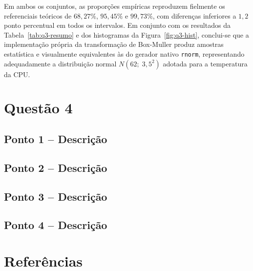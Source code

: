 \documentclass[10pt,a4paper]{article}
\begin{document}
Em ambos os conjuntos, as proporções empíricas reproduzem fielmente os referenciais teóricos de $68{,}27\%$, $95{,}45\%$ e $99{,}73\%$, com diferenças inferiores a $1{,}2$ ponto percentual em todos os intervalos. Em conjunto com os resultados da Tabela~\ref{tab:q3-resumo} e dos histogramas da Figura~\ref{fig:q3-hist}, conclui-se que a implementação própria da transformação de Box-Muller produz amostras estatística e visualmente equivalentes às do gerador nativo \texttt{rnorm}, representando adequadamente a distribuição normal $N(62;\; 3{,}5^{2})$ adotada para a temperatura da CPU.

\clearpage

\section{Questão 4}


\subsection{Ponto 1 -- Descrição}


\subsection{Ponto 2 -- Descrição}


\subsection{Ponto 3 -- Descrição}


\subsection{Ponto 4 -- Descrição}


\clearpage
\section*{Referências}
\end{document}
